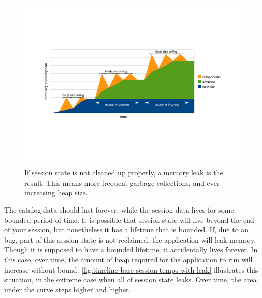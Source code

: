 \begin{figure}
	\centering
	\includegraphics[width=\textwidth]{part4/Figures/lifetime/timeline-base-session-temps-with-leak}
	\caption{If session state is not cleaned up
	properly, a memory leak is the result. This means more frequent garbage
	collections, and ever increasing heap size.}
	\label{fig:timeline-base-session-temps-with-leak}
\end{figure}

The catalog data should last forever, while the
session data lives for some bounded period of time. It is possible that session
state will live beyond the end of your session, but nonetheless it has a
lifetime that is bounded. If, due to an bug, part of this session state is not
reclaimed, the application will leak memory. Though it is supposed to have a bounded lifetime, it
 accidentally lives forever. In this
case, over time, the amount of heap required for the application to run will increase without bound.
\autoref{fig:timeline-base-session-temps-with-leak} illustrates this situation,
in the extreme case when all of session state leaks. Over time, the area under
the curve steps higher and higher.


